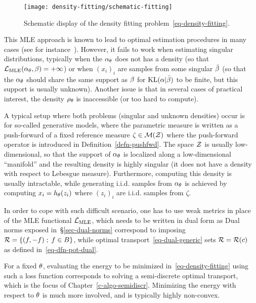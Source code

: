 \begin{figure}
\centering
\texttt{[image: density-fitting/schematic-fitting]}
\caption{\label{fig-density-fitting}
Schematic display of the density fitting problem~\ref{eq-density-fitting}.
}
\end{figure}


\newcommand{\fPF}{h}

This MLE approach is known to lead to optimal estimation procedures in many cases (see for instance~\cite{owen2001empirical}). However, it fails to work when estimating singular distributions, typically when the $\alpha_\theta$ does not has a density (so that $\mathcal{L}_{\text{MLE}}(\alpha_\theta,\beta) = +\infty$) or when $(x_i)_i$ are samples from some singular $\bar{\beta}$ (so that the $\alpha_\theta$ should share the same support as $\beta$ for $\operatorname{KL}(\alpha|\bar{\beta})$ to be finite, but this support is usually unknown). Another issue is that in several cases of practical interest, the density $\rho_{\theta}$ is inaccessible (or too hard to compute).

A typical setup where both problems (singular and unknown densities) occur is for so-called generative models, where the parametric measure is written as a push-forward of a fixed reference measure $\zeta \in \mathcal{M}(\mathcal{Z})$
\eq{
	\al_\th = \fPF_{\th,\sharp} \zeta \qwhereq \fPF_\th : \Zz \rightarrow \Xx
}
where the push-forward operator is introduced in Definition~\ref{defn-pushfwd}. The space $\mathcal{Z}$ is usually low-dimensional, so that the support of $\alpha_\theta$ is localized along a low-dimensional ``manifold'' and the resulting density is highly singular (it does not have a density with respect to Lebesgue measure).
%
Furthermore, computing this density is usually intractable, while generating i.i.d. samples from $\alpha_\theta$ is achieved by computing $x_i=\fPF_\th(z_i)$ where $(z_i)_i$ are i.i.d. samples from $\zeta$.

In order to cope with such difficult scenario, one has to use weak metrics in place of the MLE functional $\mathcal{L}_{\text{MLE}}$, which needs to be written in dual form as 
Dual norms exposed in~\S\ref{sec-dual-norms} correspond to imposing $\mathcal{R} = \left\{ (f,-f) \;;\; f \in B \right\}$, while optimal transport~\eqref{eq-dual-generic} sets $\mathcal{R} = \mathcal{R}(c)$ as defined in~\eqref{eq-dfn-pot-dual}. 

For a fixed $\theta$, evaluating the energy to be minimized in~\eqref{eq-density-fitting} using such a loss function corresponds to solving a semi-discrete optimal transport, which is the focus of Chapter~\ref{c-algo-semidiscr}. Minimizing the energy with respect to $\theta$ is much more involved, and is typically highly non-convex.

